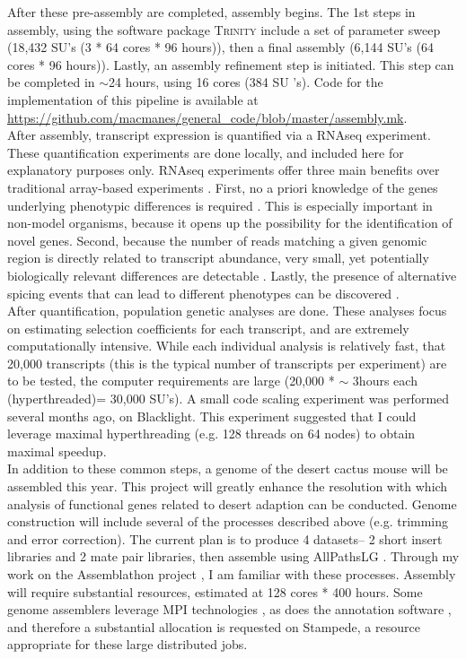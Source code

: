 \documentclass[10.5pt]{article}
\begin{document}
{\noindent
After these pre-assembly are completed, assembly begins. The 1st steps in assembly, using the software package \textsc{Trinity} include a set of parameter sweep (18,432 SU's (3 * 64 cores * 96 hours)), then a final assembly (6,144 SU's (64 cores * 96 hours)). Lastly, an assembly refinement step is initiated. This step can be completed in $\sim$24 hours, using 16 cores (384 SU
's). Code for the implementation of this pipeline is available at \url{https://github.com/macmanes/general_code/blob/master/assembly.mk}.  \\

\noindent
After assembly, transcript expression is quantified via a RNAseq experiment. These quantification experiments are done locally, and included here for explanatory purposes only. RNAseq experiments offer three main benefits over traditional array-based experiments \citep{tHoen:2008hn}. First, no a priori knowledge of the genes underlying phenotypic differences is required \citep{Gilad:2009km}.  This is especially important in non-model organisms, because it opens up the possibility for the identification of novel genes. Second, because the number of reads matching a given genomic region is directly related to transcript abundance, very small, yet potentially biologically relevant differences are detectable \citep{Mortazavi:2008jj}.  Lastly, the presence of alternative spicing events that can lead to different phenotypes can be discovered \citep{Sultan:2008jh}.  \\

\noindent
After quantification, population genetic analyses are done. These analyses focus on estimating selection coefficients for each transcript, and are extremely computationally intensive. While each individual analysis is relatively fast, that 20,000 transcripts (this is the typical number of transcripts per experiment) are to be tested, the computer requirements are large (20,000 * $\sim$ 3hours each (hyperthreaded)= 30,000 SU's). A small code scaling experiment was performed several months ago, on Blacklight. This experiment suggested that I could leverage maximal hyperthreading (e.g. 128 threads on 64 nodes) to obtain maximal speedup.  \\

\noindent
In addition to these common steps, a genome of the desert cactus mouse will be assembled this year. This project will greatly enhance the resolution with which analysis of functional genes related to desert adaption can be conducted. Genome construction will include several of the processes described above (e.g. trimming and error correction). The current plan is to produce 4 datasets-- 2 short insert libraries and 2 mate pair libraries, then assemble using AllPathsLG \citep{Maccallum:2009du}.  Through my work on the Assemblathon project \citep{Bradnam:2013uu}, I am familiar with these processes. Assembly will require substantial resources, estimated at 128 cores * 400 hours. Some genome assemblers leverage MPI technologies \citep{Simpson:2009iv}, as does the annotation software \citep{Cantarel:2008jo}, and therefore a substantial allocation is requested on Stampede, a resource appropriate for these large distributed jobs. 

}
\end{document}
